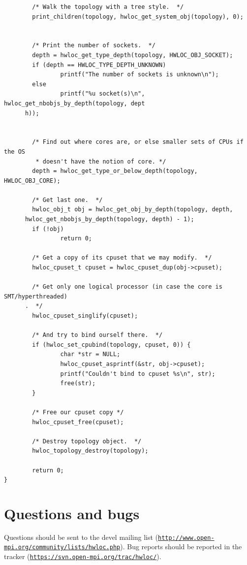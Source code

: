 \begin{DocInclude}
\begin{verbatim}
        /* Walk the topology with a tree style.  */
        print_children(topology, hwloc_get_system_obj(topology), 0);


        /* Print the number of sockets.  */
        depth = hwloc_get_type_depth(topology, HWLOC_OBJ_SOCKET);
        if (depth == HWLOC_TYPE_DEPTH_UNKNOWN)
                printf("The number of sockets is unknown\n");
        else
                printf("%u socket(s)\n", hwloc_get_nbobjs_by_depth(topology, dept
      h));


        /* Find out where cores are, or else smaller sets of CPUs if the OS
         * doesn't have the notion of core. */
        depth = hwloc_get_type_or_below_depth(topology, HWLOC_OBJ_CORE);

        /* Get last one.  */
        hwloc_obj_t obj = hwloc_get_obj_by_depth(topology, depth, 
      hwloc_get_nbobjs_by_depth(topology, depth) - 1);
        if (!obj)
                return 0;

        /* Get a copy of its cpuset that we may modify.  */
        hwloc_cpuset_t cpuset = hwloc_cpuset_dup(obj->cpuset);

        /* Get only one logical processor (in case the core is SMT/hyperthreaded)
      .  */
        hwloc_cpuset_singlify(cpuset);

        /* And try to bind ourself there.  */
        if (hwloc_set_cpubind(topology, cpuset, 0)) {
                char *str = NULL;
                hwloc_cpuset_asprintf(&str, obj->cpuset);
                printf("Couldn't bind to cpuset %s\n", str);
                free(str);
        }

        /* Free our cpuset copy */
        hwloc_cpuset_free(cpuset);

        /* Destroy topology object.  */
        hwloc_topology_destroy(topology);

        return 0;
}
\end{verbatim}
\end{DocInclude}


 \hypertarget{index_bugs}{}\section{Questions and bugs}\label{index_bugs}
Questions should be sent to the devel mailing list (\href{http://www.open-mpi.org/community/lists/hwloc.php}{\tt http://www.open-mpi.org/community/lists/hwloc.php}). Bug reports should be reported in the tracker (\href{https://svn.open-mpi.org/trac/hwloc/}{\tt https://svn.open-mpi.org/trac/hwloc/}).

